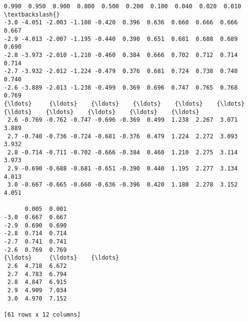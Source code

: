 \documentclass[11pt]{article}
\makeatletter
\newcommand{\boxspacing}{\kern\kvtcb@left@rule\kern\kvtcb@boxsep}
\newcommand{\prompt}[4]{
        {\ttfamily\llap{{\color{#2}[#3]:\hspace{3pt}#4}}\vspace{-\baselineskip}}
    }
\makeatother
\begin{document}
            \begin{tcolorbox}[breakable, size=fbox, boxrule=.5pt, pad at break*=1mm, opacityfill=0]
\prompt{Out}{outcolor}{ }{\boxspacing}
\begin{Verbatim}[commandchars=\\\{\}]
      0.990  0.950  0.900  0.800  0.500  0.200  0.100  0.040  0.020  0.010  \textbackslash{}
-3.0 -4.051 -2.003 -1.180 -0.420  0.396  0.636  0.660  0.666  0.666  0.667
-2.9 -4.013 -2.007 -1.195 -0.440  0.390  0.651  0.681  0.688  0.689  0.690
-2.8 -3.973 -2.010 -1.210 -0.460  0.384  0.666  0.702  0.712  0.714  0.714
-2.7 -3.932 -2.012 -1.224 -0.479  0.376  0.681  0.724  0.738  0.740  0.740
-2.6 -3.889 -2.013 -1.238 -0.499  0.369  0.696  0.747  0.765  0.768  0.769
{\ldots}     {\ldots}    {\ldots}    {\ldots}    {\ldots}    {\ldots}    {\ldots}    {\ldots}    {\ldots}    {\ldots}    {\ldots}
 2.6 -0.769 -0.762 -0.747 -0.696 -0.369  0.499  1.238  2.267  3.071  3.889
 2.7 -0.740 -0.736 -0.724 -0.681 -0.376  0.479  1.224  2.272  3.093  3.932
 2.8 -0.714 -0.711 -0.702 -0.666 -0.384  0.460  1.210  2.275  3.114  3.973
 2.9 -0.690 -0.688 -0.681 -0.651 -0.390  0.440  1.195  2.277  3.134  4.013
 3.0 -0.667 -0.665 -0.660 -0.636 -0.396  0.420  1.180  2.278  3.152  4.051

      0.005  0.001
-3.0  0.667  0.667
-2.9  0.690  0.690
-2.8  0.714  0.714
-2.7  0.741  0.741
-2.6  0.769  0.769
{\ldots}     {\ldots}    {\ldots}
 2.6  4.718  6.672
 2.7  4.783  6.794
 2.8  4.847  6.915
 2.9  4.909  7.034
 3.0  4.970  7.152

[61 rows x 12 columns]
\end{Verbatim}
\end{tcolorbox}
        
\end{document}
